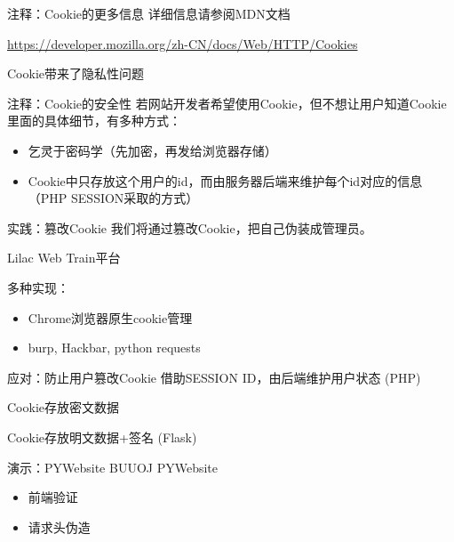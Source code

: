 \documentclass[UTF8]{ctexbeamer}
\begin{document}
\begin{frame}{注释：Cookie的更多信息}
    详细信息请参阅MDN文档

    \url{https://developer.mozilla.org/zh-CN/docs/Web/HTTP/Cookies}

    Cookie带来了隐私性问题
\end{frame}
\begin{frame}{注释：Cookie的安全性}
    若网站开发者希望使用Cookie，但不想让用户知道Cookie里面的具体细节，有多种方式：
    \begin{itemize}
        \item 乞灵于密码学（先加密，再发给浏览器存储）
        \item Cookie中只存放这个用户的id，而由服务器后端来维护每个id对应的信息（PHP SESSION采取的方式）
    \end{itemize}
\end{frame}

\begin{frame}{实践：篡改Cookie}
    我们将通过篡改Cookie，把自己伪装成管理员。
    
    Lilac Web Train平台
    
    多种实现：
    \begin{itemize}
        \item Chrome浏览器原生cookie管理
        \item burp, Hackbar, python requests
    \end{itemize}    
\end{frame}
\begin{frame}{应对：防止用户篡改Cookie}
    借助SESSION ID，由后端维护用户状态 (PHP)
    
    Cookie存放密文数据
    
    Cookie存放明文数据+签名 (Flask)
\end{frame}
\begin{frame}{演示：PYWebsite}
    BUUOJ PYWebsite
    \begin{itemize}
        \item 前端验证
        \item 请求头伪造
    \end{itemize}
\end{frame}
\end{document}
